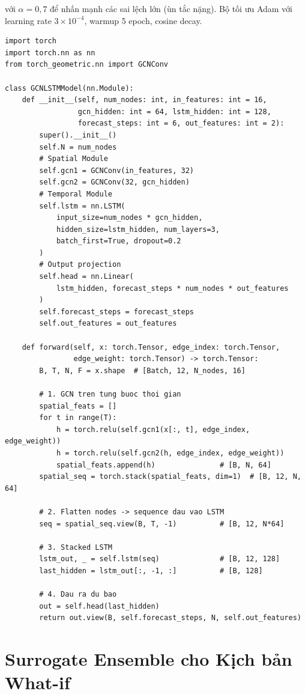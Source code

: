 với $\alpha = 0{,}7$ để nhấn mạnh các sai lệch lớn (ùn tắc nặng). Bộ tối ưu Adam với learning rate $3 \times 10^{-4}$, warmup 5 epoch, cosine decay.

\begin{lstlisting}[caption={Huấn luyện GCN–LSTM với PyTorch (trích)},label={lst:training}]
import torch
import torch.nn as nn
from torch_geometric.nn import GCNConv

class GCNLSTMModel(nn.Module):
    def __init__(self, num_nodes: int, in_features: int = 16,
                 gcn_hidden: int = 64, lstm_hidden: int = 128,
                 forecast_steps: int = 6, out_features: int = 2):
        super().__init__()
        self.N = num_nodes
        # Spatial Module
        self.gcn1 = GCNConv(in_features, 32)
        self.gcn2 = GCNConv(32, gcn_hidden)
        # Temporal Module
        self.lstm = nn.LSTM(
            input_size=num_nodes * gcn_hidden,
            hidden_size=lstm_hidden, num_layers=3,
            batch_first=True, dropout=0.2
        )
        # Output projection
        self.head = nn.Linear(
            lstm_hidden, forecast_steps * num_nodes * out_features
        )
        self.forecast_steps = forecast_steps
        self.out_features = out_features

    def forward(self, x: torch.Tensor, edge_index: torch.Tensor,
                edge_weight: torch.Tensor) -> torch.Tensor:
        B, T, N, F = x.shape  # [Batch, 12, N_nodes, 16]

        # 1. GCN tren tung buoc thoi gian
        spatial_feats = []
        for t in range(T):
            h = torch.relu(self.gcn1(x[:, t], edge_index, edge_weight))
            h = torch.relu(self.gcn2(h, edge_index, edge_weight))
            spatial_feats.append(h)               # [B, N, 64]
        spatial_seq = torch.stack(spatial_feats, dim=1)  # [B, 12, N, 64]

        # 2. Flatten nodes -> sequence dau vao LSTM
        seq = spatial_seq.view(B, T, -1)          # [B, 12, N*64]

        # 3. Stacked LSTM
        lstm_out, _ = self.lstm(seq)              # [B, 12, 128]
        last_hidden = lstm_out[:, -1, :]          # [B, 128]

        # 4. Dau ra du bao
        out = self.head(last_hidden)
        return out.view(B, self.forecast_steps, N, self.out_features)
\end{lstlisting}

\section{Surrogate Ensemble cho Kịch bản What-if}

